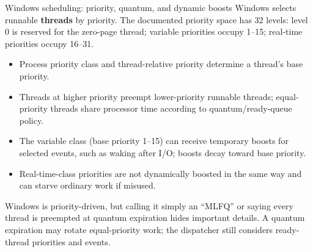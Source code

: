\documentclass[aspectratio=169,11pt]{beamer}
\begin{document}
\begin{frame}{Windows scheduling: priority, quantum, and dynamic boosts}
  \small
  Windows selects runnable \textbf{threads} by priority. The documented priority space has 32 levels: level 0 is reserved for the zero-page thread; variable priorities occupy 1--15; real-time priorities occupy 16--31.
  \begin{itemize}
    \item Process priority class and thread-relative priority determine a thread's base priority.
    \item Threads at higher priority preempt lower-priority runnable threads; equal-priority threads share processor time according to quantum/ready-queue policy.
    \item The variable class (base priority 1--15) can receive temporary boosts for selected events, such as waking after I/O; boosts decay toward base priority.
    \item Real-time-class priorities are not dynamically boosted in the same way and can starve ordinary work if misused.
  \end{itemize}
  \begin{tcolorbox}[title=Correction to a common simplification,colback=orange!5,colframe=orange!70]
    Windows is priority-driven, but calling it simply an “MLFQ” or saying every thread is preempted at quantum expiration hides important details. A quantum expiration may rotate equal-priority work; the dispatcher still considers ready-thread priorities and events.
  \end{tcolorbox}
\end{frame}
\end{document}
